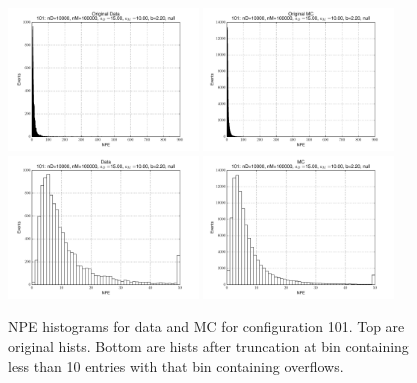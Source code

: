  \begin{figure}[htbp] \begin{center} 
\includegraphics[width=0.45\textwidth]{../FIGURES/101/FIG_Original_Data.pdf} 
\includegraphics[width=0.45\textwidth]{../FIGURES/101/FIG_Original_MC.pdf} 
\includegraphics[width=0.45\textwidth]{../FIGURES/101/FIG_Data.pdf} 
\includegraphics[width=0.45\textwidth]{../FIGURES/101/FIG_MC.pdf} 
\caption{NPE histograms for data and MC for configuration 101. Top are original hists. Bottom are hists after truncation at bin containing less than 10 entries with that bin containing overflows.} 
\label{tab:npe_101} 
\end{center} \end{figure} 
\clearpage
 